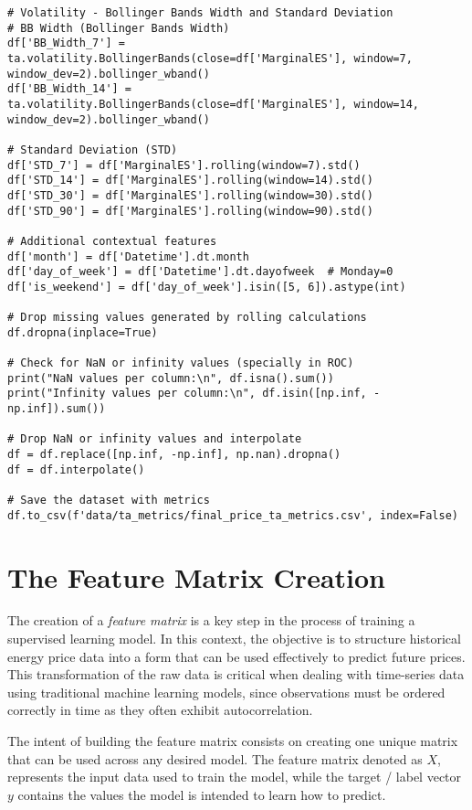 \documentclass[12pt]{report} %
\begin{document}
\begin{lstlisting}
# Volatility - Bollinger Bands Width and Standard Deviation
# BB Width (Bollinger Bands Width)
df['BB_Width_7'] = ta.volatility.BollingerBands(close=df['MarginalES'], window=7, window_dev=2).bollinger_wband()
df['BB_Width_14'] = ta.volatility.BollingerBands(close=df['MarginalES'], window=14, window_dev=2).bollinger_wband()

# Standard Deviation (STD)
df['STD_7'] = df['MarginalES'].rolling(window=7).std()
df['STD_14'] = df['MarginalES'].rolling(window=14).std()
df['STD_30'] = df['MarginalES'].rolling(window=30).std()
df['STD_90'] = df['MarginalES'].rolling(window=90).std()

# Additional contextual features
df['month'] = df['Datetime'].dt.month
df['day_of_week'] = df['Datetime'].dt.dayofweek  # Monday=0
df['is_weekend'] = df['day_of_week'].isin([5, 6]).astype(int)

# Drop missing values generated by rolling calculations
df.dropna(inplace=True)

# Check for NaN or infinity values (specially in ROC)
print("NaN values per column:\n", df.isna().sum())
print("Infinity values per column:\n", df.isin([np.inf, -np.inf]).sum())

# Drop NaN or infinity values and interpolate
df = df.replace([np.inf, -np.inf], np.nan).dropna()
df = df.interpolate()

# Save the dataset with metrics
df.to_csv(f'data/ta_metrics/final_price_ta_metrics.csv', index=False)
\end{lstlisting}


\section{The Feature Matrix Creation}

The creation of a \textit{feature matrix} is a key step in the process of training a supervised learning model. In this context, the objective is to structure historical energy price data into a form that can be used effectively to predict future prices. This transformation of the raw data is critical when dealing with time-series data using traditional machine learning models, since observations must be ordered correctly in time as they often exhibit autocorrelation.

The intent of building the feature matrix consists on creating one unique matrix that can be used across any desired model. The feature matrix denoted as $\mathit{X}$, represents the input data used to train the model, while the target / label vector $\mathit{y}$ contains the values the model is intended to learn how to predict.
\end{document}
